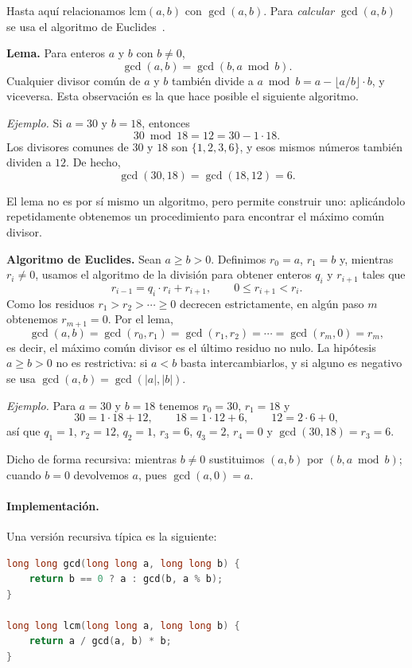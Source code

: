 Hasta aquí relacionamos $\text{lcm}(a,b)$ con $\gcd(a,b)$. Para \emph{calcular} $\gcd(a,b)$ se usa el algoritmo de Euclides~\cite{perez_numeros}.

\textbf{Lema.} Para enteros $a$ y $b$ con $b \neq 0$,
\[
\gcd(a, b) = \gcd(b, a \bmod b).
\]
Cualquier divisor común de $a$ y $b$ también divide a $a \bmod b = a - \lfloor a/b \rfloor \cdot b$, y viceversa. Esta observación es la que hace posible el siguiente algoritmo.

\textit{Ejemplo.} Si $a = 30$ y $b = 18$, entonces
\[
30 \bmod 18 = 12 = 30 - 1 \cdot 18.
\]
Los divisores comunes de $30$ y $18$ son $\{1,2,3,6\}$, y esos mismos números también dividen a $12$. De hecho,
\[
\gcd(30,18) = \gcd(18,12) = 6.
\]

El lema no es por sí mismo un algoritmo, pero permite construir uno: aplicándolo repetidamente obtenemos un procedimiento para encontrar el máximo común divisor.

\textbf{Algoritmo de Euclides.}\label{sec:euclides} Sean $a \ge b > 0$. Definimos $r_0 = a$, $r_1 = b$ y, mientras $r_i \neq 0$, usamos el algoritmo de la división para obtener enteros $q_i$ y $r_{i+1}$ tales que
\[
r_{i-1} = q_i \cdot r_i + r_{i+1}, \qquad 0 \le r_{i+1} < r_i .
\]
Como los residuos $r_1 > r_2 > \cdots \ge 0$ decrecen estrictamente, en algún paso $m$ obtenemos $r_{m+1} = 0$. Por el lema,
\[
\gcd(a,b) = \gcd(r_0, r_1) = \gcd(r_1, r_2) = \cdots = \gcd(r_m, 0) = r_m,
\]
es decir, el máximo común divisor es el último residuo no nulo. La hipótesis $a\ge b>0$ no es restrictiva: si $a<b$ basta intercambiarlos, y si alguno es negativo se usa $\gcd(a,b)=\gcd(|a|,|b|)$.

\textit{Ejemplo.} Para $a=30$ y $b=18$ tenemos $r_0=30$, $r_1=18$ y
\[
30 = 1 \cdot 18 + 12, \qquad 18 = 1 \cdot 12 + 6, \qquad 12 = 2 \cdot 6 + 0,
\]
así que $q_1=1$, $r_2=12$, $q_2=1$, $r_3=6$, $q_3=2$, $r_4=0$ y $\gcd(30,18)=r_3=6$.

Dicho de forma recursiva: mientras $b \neq 0$ sustituimos $(a,b)$ por $(b, a \bmod b)$; cuando $b=0$ devolvemos $a$, pues $\gcd(a,0)=a$.

\paragraph{Implementación.} Una versión recursiva típica es la siguiente:

\begin{lstlisting}[language=C++]
long long gcd(long long a, long long b) {
    return b == 0 ? a : gcd(b, a % b);
}

long long lcm(long long a, long long b) {
    return a / gcd(a, b) * b;
}
\end{lstlisting}
 
